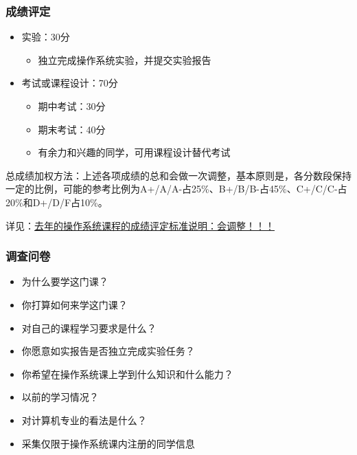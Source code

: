 \begin{frame}[fragile]
    \frametitle{成绩评定}
    \begin{itemize}
        \item 实验：30分
        \begin{itemize}
            \item 独立完成操作系统实验，并提交实验报告
        \end{itemize} %
        \item 考试或课程设计：70分
        \begin{itemize}
            \item 期中考试：30分
            \item 期末考试：40分
            \item 有余力和兴趣的同学，可用课程设计替代考试
        \end{itemize}

    \end{itemize} %

    总成绩加权方法：上述各项成绩的总和会做一次调整，基本原则是，各分数段保持一定的比例，可能的参考比例为A+/A/A-占25\%、B+/B/B-占45\%、C+/C/C-占20\%和D+/D/F占10\%。 
    \newline \newline
    
    详见：\href{http://os.cs.tsinghua.edu.cn/oscourse/OS2020spring/log#A20200210-.2BZM1PXHz7ft.2BL.2FnoLdoRiEH7pi8RbmmgHUcaL9GYO-}{去年的操作系统课程的成绩评定标准说明：会调整！！！}
    
\end{frame}

    
    \begin{frame}
        \frametitle{调查问卷}
        \begin{itemize}
            \item 为什么要学这门课？ %
            \item 你打算如何来学这门课？
            \item 对自己的课程学习要求是什么？
            \item 你愿意如实报告是否独立完成实验任务？
            \item 你希望在操作系统课上学到什么知识和什么能力？ %
            \item 以前的学习情况？
            \item 对计算机专业的看法是什么？ %
            \item 采集仅限于操作系统课内注册的同学信息
        \end{itemize}
    \end{frame}


